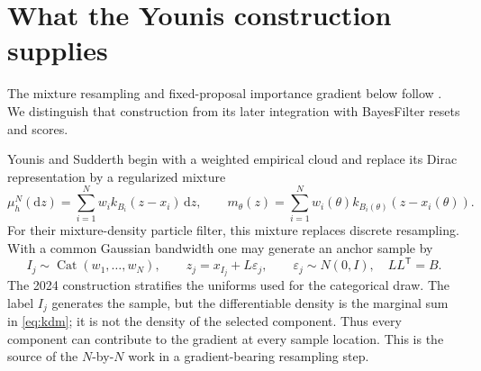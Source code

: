 \documentclass[11pt]{article}
\newcommand{\dd}{\mathrm{d}}
\begin{document}
\section{What the Younis construction supplies}
\label{sec:younis}

The mixture resampling and fixed-proposal importance gradient below follow
\citet[Section~4, equations (14)--(15)]{younis2023}. We distinguish that
construction from its later integration with BayesFilter resets and scores.


Younis and Sudderth begin with a weighted empirical cloud and replace its
Dirac representation by a regularized mixture
\begin{equation}
 \mu_h^N(\dd z)
   = \sum_{i=1}^{N} w_i k_{B_i}(z-x_i)\,\dd z,
 \qquad
 m_\theta(z)=\sum_{i=1}^{N}
       w_i(\theta)k_{B_i(\theta)}(z-x_i(\theta)).
 \label{eq:kdm}
\end{equation}
For their mixture-density particle filter, this mixture replaces discrete
resampling.  With a common Gaussian bandwidth one may generate an anchor
sample by
\begin{equation}
 I_j\sim\operatorname{Cat}(w_1,\ldots,w_N),\qquad
 z_j=x_{I_j}+L\varepsilon_j,\qquad
 \varepsilon_j\sim N(0,I),\quad LL^\mathsf{T}=B.
 \label{eq:younis-sampling}
\end{equation}
The 2024 construction stratifies the uniforms used for the categorical draw.
The label $I_j$ generates the sample, but the differentiable density is the
marginal sum in \eqref{eq:kdm}; it is not the density of the selected
component.  Thus every component can contribute to the gradient at every
sample location.  This is the source of the $N$-by-$N$ work in a
gradient-bearing resampling step.
\end{document}
